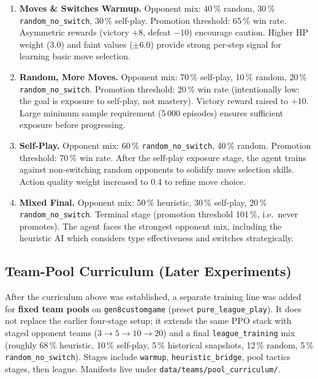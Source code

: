 \begin{enumerate}
  \item \textbf{Moves \& Switches Warmup.}
        Opponent mix: 40\,\% random, 30\,\% \texttt{random\_no\_switch},
        30\,\% self-play.  Promotion threshold: 65\,\% win rate.
        Asymmetric rewards (victory $+8$, defeat $-10$) encourage caution.
        Higher HP weight (3.0) and faint values ($\pm 6.0$) provide strong
        per-step signal for learning basic move selection.

  \item \textbf{Random, More Moves.}
        Opponent mix: 70\,\% self-play, 10\,\% random,
        20\,\% \texttt{random\_no\_switch}.  Promotion threshold: 20\,\% win
        rate (intentionally low: the goal is exposure to self-play, not
        mastery).  Victory reward raised to $+10$.  Large minimum sample
        requirement (5\,000 episodes) ensures sufficient exposure before
        progressing.

  \item \textbf{Self-Play.}
        Opponent mix: 60\,\% \texttt{random\_no\_switch},
        40\,\% random.  Promotion threshold: 70\,\% win rate.
        After the self-play exposure stage, the agent trains against
        non-switching random opponents to solidify move selection skills.
        Action quality weight increased to 0.4 to refine move choice.

  \item \textbf{Mixed Final.}
        Opponent mix: 50\,\% heuristic, 30\,\% self-play,
        20\,\% \texttt{random\_no\_switch}.  Terminal stage (promotion
        threshold 101\,\%, i.e.\ never promotes).  The agent faces the
        strongest opponent mix, including the heuristic AI which considers
        type effectiveness and switches strategically.
\end{enumerate}

\subsection{Team-Pool Curriculum (Later Experiments)}
\label{sec:team_pool_curriculum}

After the curriculum above was established, a separate training line was added
for \textbf{fixed team pools} on \texttt{gen8customgame} (preset
\texttt{pure\_league\_play}).  It does not replace the earlier four-stage setup;
it extends the same PPO stack with staged opponent teams
($3 \to 5 \to 10 \to 20$) and a final \texttt{league\_training} mix
(roughly 68\,\% heuristic, 10\,\% self-play, 5\,\% historical snapshots,
12\,\% random, 5\,\% \texttt{random\_no\_switch}).  Stages include
\texttt{warmup}, \texttt{heuristic\_bridge}, pool tactics stages, then league.
Manifests live under \texttt{data/teams/pool\_curriculum/}.

